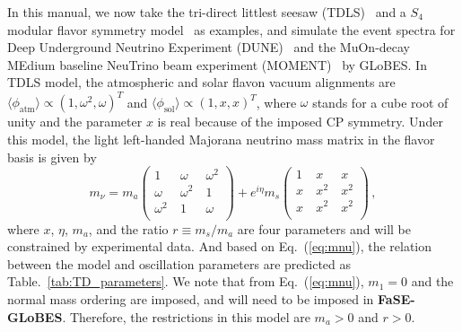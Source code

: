 \documentclass[aps,prd,nofootinbib,preprint]{revtex4}
\begin{document}
In this manual, we now take the tri-direct littlest seesaw (TDLS)~\cite{King:2013iva,King:2015dvf,King:2016yvg} {\color{blue}and a $S_4$ modular flavor symmetry model~\cite{deMedeirosVarzielas:2019cyj} as examples}, and simulate the event spectra for {\color{blue}Deep Underground Neutrino Experiment (DUNE)~\cite{Acciarri:2015uup}} and the MuOn-decay MEdium baseline NeuTrino beam experiment (MOMENT)~\cite{Cao:2014bea} by GLoBES. 
In TDLS model, the atmospheric and solar flavon vacuum alignments are $\langle\phi_{\text{atm}}\rangle\propto\left(1, \omega^2, \omega\right)^T$ and $\langle\phi_{\text{sol}}\rangle\propto\left(1, x, x\right)^T$,
where $\omega$ stands for a cube root of unity and the parameter $x$ is real because of the imposed CP symmetry. Under this model, the light left-handed Majorana neutrino mass matrix {\color{blue}in the flavor basis} is given by
\begin{equation}
\label{eq:mnu}  m_{\nu}=m_{a}\begin{pmatrix}
 1 &~ \omega  &~ \omega ^2 \\
 \omega  &~ \omega ^2 &~ 1 \\
 \omega ^2 &~ 1 &~ \omega  \\
\end{pmatrix}+e^{i\eta}m_{s}
\begin{pmatrix}
 1 &~  x &~  x \\
 x &~ x^2 &~ x^2 \\
 x &~ x^2 &~ x^2 \\
\end{pmatrix}\,,
\end{equation}
where $x$, $\eta$, $m_a$, and the ratio $r\equiv m_s/m_a$ are four parameters and will be constrained by experimental data. And based on Eq.~(\ref{eq:mnu}), the relation between the model and oscillation parameters are predicted as Table.~\ref{tab:TD_parameters}. We note that from Eq.~(\ref{eq:mnu}), $m_1=0$ and the normal mass ordering are imposed, and will need to be imposed in \textbf{FaSE-GLoBES}. Therefore, the restrictions in this model are $m_a>0$ and $r>0$.
\end{document}
